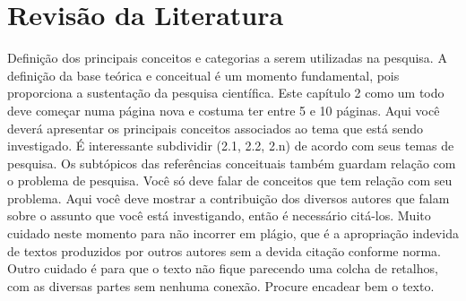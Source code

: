 \chapter{Revisão da Literatura}
Definição dos principais conceitos e categorias a serem utilizadas na pesquisa. A definição da base teórica e conceitual é um momento fundamental, pois proporciona a sustentação da pesquisa científica. Este capítulo 2 como um todo deve começar numa página nova e costuma ter entre 5 e 10 páginas.
Aqui você deverá apresentar os principais conceitos associados ao tema que está sendo investigado. É interessante subdividir (2.1, 2.2, 2.n) de acordo com seus temas de pesquisa. Os subtópicos das referências conceituais também guardam relação com o problema de pesquisa. Você só deve falar de conceitos que tem relação com seu problema. Aqui você deve mostrar a contribuição dos diversos autores que falam sobre o assunto que você está investigando, então é necessário citá-los. 
Muito cuidado neste momento para não incorrer em plágio, que é a apropriação indevida de textos produzidos por outros autores sem a devida citação conforme norma. Outro cuidado é para que o texto não fique parecendo uma colcha de retalhos, com as diversas partes sem nenhuma conexão. Procure encadear bem o texto.